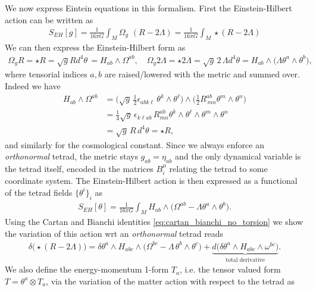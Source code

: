 We now express Eintein equations in this formalism.
First the Einstein-Hilbert action can be written as
\begin{align}
    S_{EH}[g] = \frac{1}{16\pi G}\int_M \Omega_g\,\,(R-2\Lambda) 
    = \frac{1}{16\pi G}\int_M \star (R-2\Lambda) 
\end{align}
We can then express the Einstein-Hilbert form as
\begin{align}
    \Omega_g R = \star R = \sqrt{g} R d^4\theta\, = H_{ab}\wedge \Omega^{ab},\quad \Omega_g 2\Lambda = \star 2\Lambda = \sqrt{g}\, 2\,\Lambda d^4\theta = H_{ab}\wedge \Big( \Lambda \theta^a \wedge \theta^b\Big),
\end{align}
where tensorial indices $a,b$ are raised/lowered with the metric and summed over.
Indeed we have
\begin{align}
    H_{ab}\wedge \Omega^{ab} &= \Big( \sqrt{g}\, \tfrac12 \epsilon_{abk\ell}\, \theta^k \wedge \theta^\ell\Big) \wedge \Big( \tfrac{1}{2} R^{ab}_{\,mn} \theta^m \wedge \theta^n\Big)\\
    &=\tfrac14 \sqrt{g}\,\epsilon_{k\ell ab}\, R^{ab}_{mn} \theta^k\wedge\theta^\ell\wedge\theta^m\wedge \theta^n\\
    &= \sqrt{g}\, R\, d^4\theta = \star R,
\end{align}
and similarly for the cosmological constant.
Since we always enforce an \emph{orthonormal} tetrad, the metric stays $g_{ab}=\eta_{ab}$ and the only dynamical variable is the tetrad itself, encoded in the matrices $B_i^\mu$ relating the tetrad to some coordinate system.
The Einstein-Hilbert action is then expressed as a functional of the tetrad fields $\{\theta^i\}_i$ as
\begin{align}
    S_{EH}[\theta] = \frac{1}{16\pi G}\int_M H_{ab}\wedge \Big( \Omega^{ab} - \Lambda \theta^a \wedge \theta^b\Big).
\end{align}
Using the Cartan and Bianchi identities \eqref{eq:cartan_bianchi_no_torsion} we show the variation of this action wrt an \emph{orthonormal} tetrad reads
\begin{align}
    \delta\big(\star (R-2\Lambda) \big)= \delta \theta^a \wedge H_{abc}\wedge \Big( \Omega^{bc} - \Lambda \,\theta^b \wedge \theta^c\Big) + \underbrace{d\Big( \delta \theta^a \wedge H_{abc} \wedge \omega^{bc}\Big)}_{\text{total derivative}}.
\end{align}
We also define the energy-momentum 1-form $T_a$, i.e. the tensor valued form $T=\theta^a\otimes T_a$, via the variation of the matter action with respect to the tetrad as
